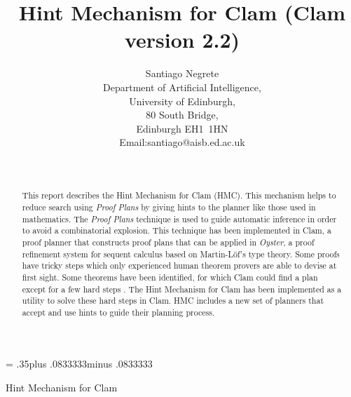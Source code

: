 %
%

\def\version{2.2}
\def\thebibliography#1{\section*{References}\list
{[\arabic{enumi}]}{\settowidth\labelwidth{[#1]}\leftmargin\labelwidth
 \advance\leftmargin\labelsep
 \usecounter{enumi}}
 \def\newblock{\hskip .11em plus .33em minus -.07em}
 \sloppy
 \sfcode`\.=1000\relax}
\pagestyle{myheadings}
\parskip= .35\baselineskip plus .0833333\baselineskip minus .0833333\baselineskip
\parindent=0pt

\renewcommand{\theenumii}{\alph{enumii}}
\renewcommand{\theenumiii}{\roman{enumiii}}


{Hint Mechanism for Clam}
\title{Hint Mechanism for Clam (Clam version \version)}

\author{Santiago Negrete\\
Department of Artificial Intelligence,\\
University of Edinburgh,\\
80 South Bridge,\\
Edinburgh EH1~1HN\\
Email:santiago@aisb.ed.ac.uk
}

\date{\ }

\renewcommand{\textfraction}{.1}
\renewcommand{\topfraction}{1}
\renewcommand{\bottomfraction}{1}


\maketitle


\begin{abstract}

        This report describes the Hint Mechanism for Clam (HMC). This 
mechanism helps to reduce search using {\em Proof Plans} by giving 
hints to the planner like those used in mathematics. The {\em Proof Plans}
technique is used to guide automatic inference in order to avoid a
combinatorial explosion. This technique has been implemented in Clam,
a proof planner that constructs proof plans that can be applied in {
\em Oyster}, a proof refinement system for sequent calculus based on
Martin-L\"of's type theory. Some proofs have tricky steps which only
experienced human theorem provers are able to devise at first sight.
Some theorems have been identified, for which Clam could find a plan
except for a few hard steps . The Hint Mechanism for Clam has been
implemented as a utility to solve these hard steps in Clam. HMC
includes a new set of planners that accept and use hints to guide
their planning process. 

\end{abstract}


